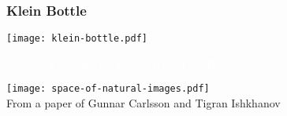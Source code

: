 \documentclass[14pt]{beamer}
\begin{document}
\begin{frame}
\frametitle{Klein Bottle}
\vfill
\begin{center}
\texttt{[image: klein-bottle.pdf]}
\end{center}
\vfill
\end{frame}


\begin{frame}
\end{frame}
\begin{frame}
\end{frame}
\begin{frame}
\end{frame}
\begin{frame}
\huge
\pause
\vfill
\textcolor{white}{Look at $3 \times 3$ pixel subsets}
\vfill
\pause
\textcolor{white}{Get points in $\mathbf{R}^9$}
\vfill
\end{frame}
\usebackgroundtemplate{}

\begin{frame}
  \texttt{[image: space-of-natural-images.pdf]} \\
  \hfill\scriptsize {From a paper of Gunnar Carlsson and Tigran Ishkhanov}
\end{frame}
\end{document}
